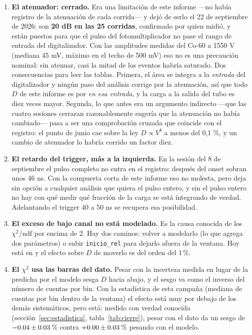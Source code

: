 \documentclass[11pt,a4paper]{article}
\begin{document}
\begin{enumerate}
\item \textbf{El atenuador: cerrado.} Era una limitación de este informe
      —no había registro de la atenuación de cada corrida— y dejó de serlo el
      22 de septiembre de 2026: son \textbf{20 dB en las 25 corridas},
      confirmado por quien midió, y están puestos para que el pulso del
      fotomultiplicador no pase el rango de entrada del digitalizador. Con las
      amplitudes medidas del Co-60 a 1550 V (mediana 45 mV, máximo en el techo
      de 500 mV) eso no es una precaución nominal: sin atenuar, casi la mitad
      de los eventos habría saturado. Dos consecuencias para leer las tablas.
      Primera, el área se integra a la \emph{entrada} del digitalizador y
      ningún paso del análisis corrige por la atenuación, así que todo $D$ de
      este informe es por \mVns{} \emph{en esa entrada}, y la carga a la salida
      del tubo es diez veces mayor. Segunda, lo que antes era un argumento
      indirecto —que las cuatro sesiones cerraran razonablemente sugería que la
      atenuación no había cambiado— pasa a ser una comprobación cruzada que
      coincide con el registro: el punto de junio cae sobre la ley
      $D \propto V^{b}$ a menos del 0,1 \%, y un cambio de atenuador lo habría
      corrido un factor diez.

\item \textbf{El retardo del trigger, más a la izquierda.} En la sesión del 8
      de septiembre el pulso completo no entra en el registro: después del
      onset sobran unos 46 ns. Con la compuerta corta de este informe eso no
      molesta, pero deja sin opción a cualquier análisis que quiera el pulso
      entero, y sin el pulso entero no hay con qué medir qué fracción de la
      carga se está integrando de verdad. Adelantando el trigger 40 a 50 ns se
      recupera esa posibilidad.

\item \textbf{El exceso de bajo canal no está modelado.} Es la causa conocida
      de los $\chi^2$/ndf por encima de 2. Hay dos caminos: volver a modelarlo
      (lo que agrega dos parámetros) o subir \texttt{inicio\_rel} para dejarlo
      afuera de la ventana. Hoy está en \InicioRel{} y el efecto sobre $D$ de
      moverlo es del orden del 1\,\%.

\item \textbf{El $\chi^2$ usa las barras del dato.} Pesar con la incerteza
      medida en lugar de la predicha por el modelo sesga $D$ hacia abajo, y el
      sesgo va como el inverso del número de cuentas por bin. Con la
      estadística de esta campaña (mediana de \CuentasBin{} cuentas por bin
      dentro de la ventana) el efecto está muy por debajo de los demás
      sistemáticos, pero está: medido con verdad conocida
      (sección~\ref{sec:estadistica}, tabla~\ref{tab:cierre}), pesar con el
      dato da un sesgo de $-0.04 \pm 0.03$\,\%
      contra $+0.00 \pm 0.03$\,\% pesando
      con el modelo.


\end{enumerate}
\end{document}
